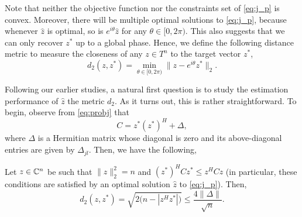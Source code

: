 Note that neither the objective function nor the constraints set of
\eqref{eq:j_p} is convex.
Moreover,
there will be multiple optimal solutions to \eqref{eq:j_p},
because whenever $\hat z$ is optimal,
so is $e^{i\theta}\hat z$ for any $\theta\in[0,2\pi)$.
This also suggests that we can only recover $z^*$ up to a global phase.
Hence,
we define the following distance metric to measure the closeness of
any $z\in T^n$ to the target vector $z^*$,
\begin{equation}
    d_2(z,z^*)=\min_{\theta\in[0,2\pi)}\|z-e^{i\theta}z^*\|_2.
\end{equation}

Following our earlier studies,
a natural first question is to study the estimation performance of $\hat z$
\wrt the metric $d_2$.
As it turns out,
this is rather straightforward.
To begin,
observe from \eqref{eq:probj} that
\begin{equation}
    C=z^*(z^*)^H+\Delta,
\end{equation}
where $\Delta$ is a Hermitian matrix whose diagonal is zero
and its above-diagonal entries are given by $\Delta_{jl}$.
Then,
we have the following,
\begin{pro}\label{pro:j1}
Let $z\in{\mathbb{C}}^n$ be such that $\|z\|_2^2=n$ and $(z^*)^HCz^*\le z^HCz$
(in particular,
these conditions are satisfied by an optimal solution
$\hat z$ to \eqref{eq:j_p}).
Then,
\begin{equation}
    d_2(z,z^*) = \sqrt{2\big(n-|z^Hz^*|\big)}\le\frac{4\|\Delta\|}{\sqrt{n}}.
\end{equation}
\end{pro}
